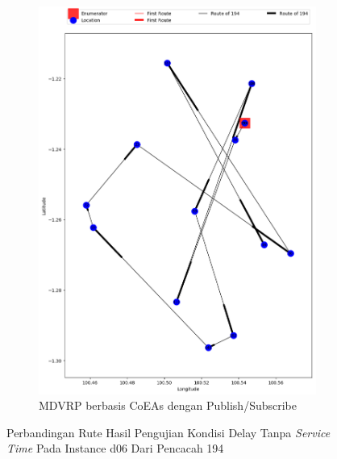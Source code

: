 \begin{figure}[H]\ContinuedFloat
	\centering
	\begin{subfigure}[t]{\textwidth}
		\centering
		\includegraphics[width=\textwidth]{Resources/Images/delayed_6/real_m15_n100_delayed_6_194_pubsub_coes}
		\caption{MDVRP berbasis CoEAs dengan Publish/Subscribe}
		\label{fig:real_m15_n100_delayed_6_194_pubsub_coes}
	\end{subfigure}
	\caption{Perbandingan Rute Hasil Pengujian Kondisi Delay Tanpa \textit{Service Time} Pada Instance d06 Dari Pencacah 194}
	\label{fig:real_m15_n100_delayed_6_194_contd}
\end{figure}


